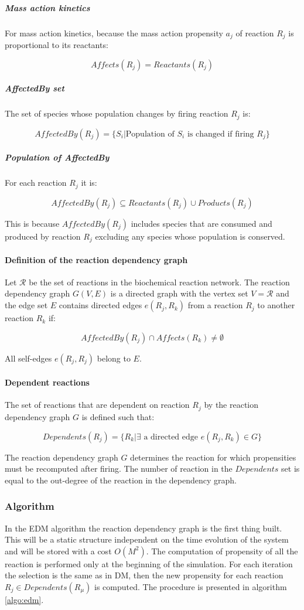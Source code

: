         \subparagraph{Mass action kinetics}
        For mass action kinetics, because the mass action propensity $a_j$ of reaction $R_j$ is proportional to its reactants:

        $$Affects(R_j) = Reactants(R_j)$$

        \subparagraph{AffectedBy set}
        The set of species whose population changes by firing reaction $R_j$ is:

        $$AffectedBy(R_j) = \{S_i|\text{Population of }S_i\text{ is changed if firing }R_j\}$$

        \subparagraph{Population of AffectedBy}
        For each reaction $R_j$ it is:

        $$AffectedBy(R_j)\subseteq Reactants(R_j)\cup Products(R_j)$$

        This is because $AffectedBy(R_j)$ includes species that are consumed and produced by reaction $R_j$ excluding any species whose population is conserved.

      \paragraph{Definition of the reaction dependency graph}
      Let $\mathcal{R}$ be the set of reactions in the biochemical reaction network.
      The reaction dependency graph $G(V, E)$ is a directed graph with the vertex set $V = \mathcal{R}$ and the edge set $E$ contains directed edges $e(R_j, R_k)$ from a reaction $R_j$ to another reaction $R_k$ if:

      $$AffectedBy(R_j)\cap Affects(R_k)\neq\emptyset$$

      All self-edges $e(R_j, R_j)$ belong to $E$.

      \paragraph{Dependent reactions}
      The set of reactions that are dependent on reaction $R_j$ by the reaction dependency graph $G$ is defined such that:

      $$Dependents(R_j) = \{R_k|\exists\text{ a directed edge }e(R_j,R_k)\in G\}$$

      The reaction dependency graph $G$ determines the reaction for which propensities must be recomputed after firing.
      The number of reaction in the $Dependents$ set is equal to the out-degree of the reaction in the dependency graph.

    \subsubsection{Algorithm}
    In the EDM algorithm the reaction dependency graph is the first thing built.
    This will be a static structure independent on the time evolution of the system and will be stored with a cost $O(M^2)$.
    The computation of propensity of all the reaction is performed only at the beginning of the simulation.
    For each iteration the selection is the same as in DM, then the new propensity for each reaction $R_j\in Dependents(R_\mu)$ is computed.
    The procedure is presented in algorithm \ref{algo:edm}.

